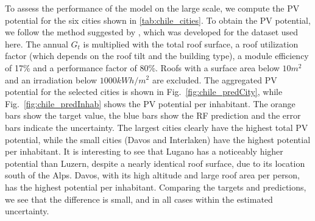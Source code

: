 To assess the performance of the model on the large scale, we compute the PV potential for the six cities shown in \ref{tab:chile_cities}. To obtain the PV potential, we follow the method suggested by \cite{portmann_sonnendach.ch:_2016}, which was developed for the dataset used here. The annual $G_t$ is multiplied with the total roof surface, a roof utilization factor (which depends on the roof tilt and the building type), a module efficiency of 17\% and a performance factor of 80\%. Roofs with a surface area below $10 m^2$ and an irradiation below $1000 kWh/m^2$ are excluded. The aggregated PV potential for the selected cities is shown in Fig.~\ref{fig:chile_predCity}, while Fig.~\ref{fig:chile_predInhab} shows the PV potential per inhabitant. The orange bars show the target value, the blue bars show the RF prediction and the error bars indicate the uncertainty. The largest cities clearly have the highest total PV potential, while the small cities (Davos and Interlaken) have the highest potential per inhabitant. It is interesting to see that Lugano has a noticeably higher potential than Luzern, despite a nearly identical roof surface, due to its location south of the Alps. Davos, with its high altitude and large roof area per person, has the highest potential per inhabitant. Comparing the targets and predictions, we see that the difference is small, and in all cases within the estimated uncertainty.

